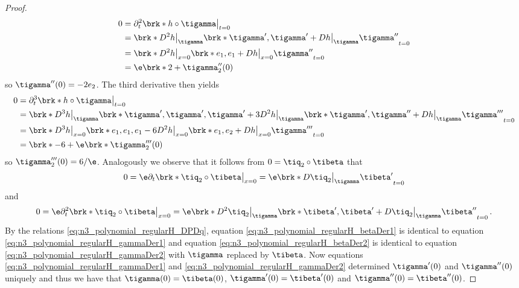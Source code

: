 \begin{proof}
\begin{align}
    \begin{aligned}
    0&=\partial_t^2\brk*{h\circ\tigamma}\big\vert_{t=0}  \\
    &=\brk*{D^2h\big\vert_{\tigamma}\brk*{\tigamma',\tigamma'}+Dh\big\vert_{\tigamma}\tigamma''}_{t=0} \\
    &=\brk*{D^2h\big\vert_{x=0}\brk*{e_1,e_1}+Dh\big\vert_{x=0}\tigamma''}_{t=0} \\
    &=\e\brk*{2+\tigamma_2''}(0)
    \end{aligned}
    \label{eq:n3_polynomial_regularH_gammaDer2}
  \end{align}
  so $\tigamma''(0)=-2e_2$.
  The third derivative then yields
  \begin{align*}
    0&=\partial_t^3\brk*{h\circ\tigamma}\big\vert_{t=0} \\
    &=\brk*{D^3h\big\vert_{\tigamma}\brk*{\tigamma',\tigamma',\tigamma'}
    +3D^2h\big\vert_{\tigamma}\brk*{\tigamma',\tigamma''}
    +Dh\big\vert_{\tigamma}\tigamma'''}_{t=0} \\
    &=\brk*{D^3h\big\vert_{x=0}\brk*{e_1,e_1,e_1}
    -6D^2h\big\vert_{x=0}\brk*{e_1,e_2}
    +Dh\big\vert_{x=0}\tigamma'''}_{t=0} \\
    &=\brk*{-6+\e\brk*{\tigamma_2'''}}(0)
  \end{align*}
  so $\tigamma_2'''(0)=6/\e$.
  Analogously we observe that it follows from $0=\tiq_2\circ\tibeta$ that
  \begin{align}
    0=\e\partial_t\brk*{\tiq_2\circ\tibeta}\big\vert_{x=0}
    =\e\brk*{D\tiq_2\big\vert_{\tigamma}\tibeta'}_{t=0}
    \label{eq:n3_polynomial_regularH_betaDer1}
  \end{align}
  and
  \begin{align}
    0=\e\partial_t^2\brk*{\tiq_2\circ\tibeta}\big\vert_{x=0}
    =\e\brk*{D^2\tiq_2\big\vert_{\tigamma}\brk*{\tibeta',\tibeta'}+D\tiq_2\big\vert_{\tigamma}\tibeta''}_{t=0}\,.
    \label{eq:n3_polynomial_regularH_betaDer2}
  \end{align}
  By the relations \eqref{eq:n3_polynomial_regularH_DPDq}, equation \eqref{eq:n3_polynomial_regularH_betaDer1} is identical to
  equation \eqref{eq:n3_polynomial_regularH_gammaDer1} 
  and equation  \eqref{eq:n3_polynomial_regularH_betaDer2} is identical to equation 
  \eqref{eq:n3_polynomial_regularH_gammaDer2} with $\tigamma$ replaced by $\tibeta$.
  Now equations  \eqref{eq:n3_polynomial_regularH_gammaDer1} and  \eqref{eq:n3_polynomial_regularH_gammaDer2}
  determined $\tigamma'(0)$ and $\tigamma''(0)$ uniquely and thus we have that
  $\tigamma(0)=\tibeta(0)$, $\tigamma'(0)=\tibeta'(0)$ and $\tigamma''(0)=\tibeta''(0)$.

\end{proof}

